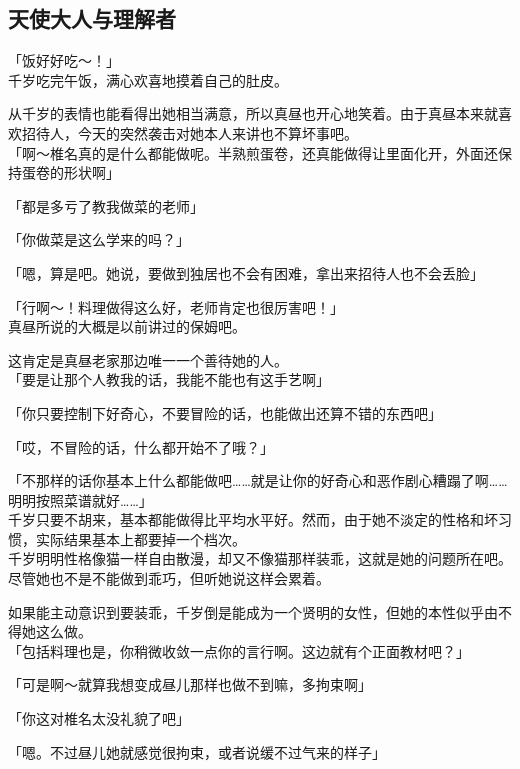 \subsection{天使大人与理解者}

「饭好好吃～！」\\

千岁吃完午饭，满心欢喜地摸着自己的肚皮。

从千岁的表情也能看得出她相当满意，所以真昼也开心地笑着。由于真昼本来就喜欢招待人，今天的突然袭击对她本人来讲也不算坏事吧。\\

「啊～椎名真的是什么都能做呢。半熟煎蛋卷，还真能做得让里面化开，外面还保持蛋卷的形状啊」

「都是多亏了教我做菜的老师」

「你做菜是这么学来的吗？」

「嗯，算是吧。她说，要做到独居也不会有困难，拿出来招待人也不会丢脸」

「行啊～！料理做得这么好，老师肯定也很厉害吧！」\\

真昼所说的大概是以前讲过的保姆吧。

这肯定是真昼老家那边唯一一个善待她的人。\\

「要是让那个人教我的话，我能不能也有这手艺啊」

「你只要控制下好奇心，不要冒险的话，也能做出还算不错的东西吧」

「哎，不冒险的话，什么都开始不了哦？」

「不那样的话你基本上什么都能做吧……就是让你的好奇心和恶作剧心糟蹋了啊……明明按照菜谱就好……」\\

千岁只要不胡来，基本都能做得比平均水平好。然而，由于她不淡定的性格和坏习惯，实际结果基本上都要掉一个档次。\\

千岁明明性格像猫一样自由散漫，却又不像猫那样装乖，这就是她的问题所在吧。尽管她也不是不能做到乖巧，但听她说这样会累着。

如果能主动意识到要装乖，千岁倒是能成为一个贤明的女性，但她的本性似乎由不得她这么做。\\

「包括料理也是，你稍微收敛一点你的言行啊。这边就有个正面教材吧？」

「可是啊～就算我想变成昼儿那样也做不到嘛，多拘束啊」

「你这对椎名太没礼貌了吧」

「嗯。不过昼儿她就感觉很拘束，或者说缓不过气来的样子」\\

